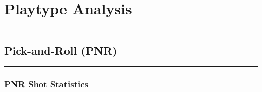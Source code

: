 \documentclass[a4paper,12pt]{article}
\begin{document}
\section{Playtype Analysis}

\vspace{1em} %
\hrule height 1pt width 1\textwidth %
\vspace{1em} %

\subsection{Pick-and-Roll (PNR)}

\vspace{1em} %
\hrule height 1pt width 1\textwidth %
\vspace{1em} %

\subsubsection{PNR Shot Statistics}
\end{document}
